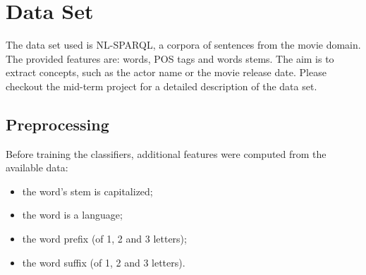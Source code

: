 \section{Data Set}
\label{sec:dataset}

The data set used is NL-SPARQL, a corpora of sentences from the movie domain.
The provided features are: words, \ac{POS} tags and words stems.
The aim is to extract concepts, such as the actor name or the movie release date.
Please checkout the mid-term project for a detailed description of the data set.

\subsection{Preprocessing}
Before training the classifiers, additional features were computed from the available data:
\begin{itemize}
    \item the word's stem is capitalized;
    \item the word is a language;
    \item the word prefix (of 1, 2 and 3 letters);
    \item the word suffix (of 1, 2 and 3 letters).
\end{itemize}
